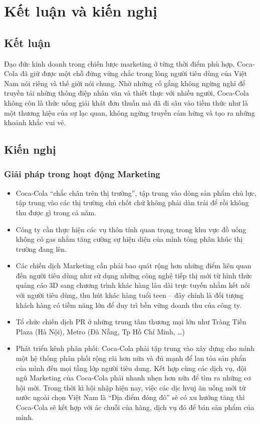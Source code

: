 \documentclass{article}
\begin{document}
\newpage
\section{Kết luận và kiến nghị}
\subsection{Kết luận}
    \vspace{0.2cm}
    Đạo đức kinh doanh trong chiến lược marketing ở từng thời điểm phù hợp, Coca-Cola đã giữ được một chỗ đứng vững chắc trong lòng người tiêu dùng của Việt Nam nói riêng và thế giới nói chung. Nhờ những cố gắng không ngừng nghỉ để truyền tải những thông điệp nhân văn và thiết thực với nhiều người, Coca-Cola không còn là thức uống giải khát đơn thuần mà đã đi sâu vào tiềm thức như là một thương hiệu của sự lạc quan, không ngừng truyền cảm hứng và tạo ra những khoảnh khắc vui vẻ. 

\subsection{Kiến nghị}
    \subsubsection{Giải pháp trong hoạt động Marketing}
    \begin{itemize}
        \item Coca-Cola “chắc chân trên thị trường”, tập trung vào dòng sản phẩm chủ lực, tập trung vào các thị trường chủ chốt chứ không phải dàn trải để rồi không thu được gì trong cả năm.
        \item Công ty cần thực hiện các vụ thôn tính quan trọng trong khu vực đồ uống không có gas nhằm tăng cường sự hiện diện của mình tỏng phân khúc thị trường đang lên.
        \item Các chiến dịch Marketing cần phải bao quát rộng hơn những điểm liên quan đến người tiêu dùng như sử dụng những công nghệ tiếp thị mới từ hình thức quảng cáo 3D sang chương trình khác hàng lâu dài trực tuyến nhằm kết nối với người tiêu dùng, thu hút khác hàng tuổi teen – đây chính là đối tượng khách hàng có tiềm năng lớn để duy trì bền vững doanh thu của công ty.
        \item Tổ chức chiến dịch PR ở những trung tâm thương mại lớn như Tràng Tiền Plaza (Hà Nội), Metro (Đà Nẵng, Tp Hồ Chí Minh, …)
        \item Phát triển kênh phân phối: Coca-Cola phải tập trung vào xây dựng cho mình một hệ thống phân phối rộng rãi hơn nữa và đủ mạnh để lan tỏa sản phẩn của mình đến mọi tầng lớp người tiêu dung. Kết hợp cùng các dịch vụ, đội ngũ Marketing của Coca-Cola phải nhanh nhẹn hơn nữa để tìm ra những cơ hội mới. Trong thời kì hội nhập hiện nay, việc các dịc hvuj ăn uống mới từ nước ngoài chọn Việt Nam là “Địa điểm đóng đô” sẽ có xu hướng tăng thì Coca-Cola sẽ kết hợp với ác chuỗi của hàng, dịch vụ đó để bán sản phẩm của mình.
    \end{itemize}
\end{document}
